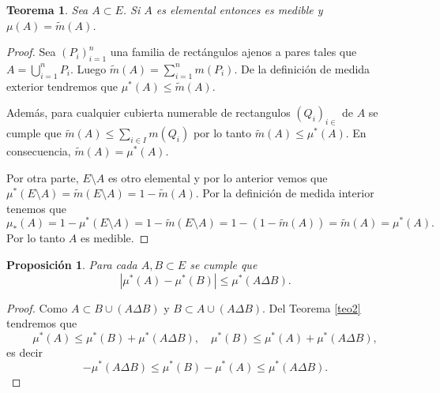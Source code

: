 \documentclass[twoside,12pt,a4 paper,openright]{book}
\newtheorem{teo}[claim]{Teorema}
\newtheorem{pro}[claim]{Proposici\'on}
\begin{document}
\begin{teo}Sea $A\subset E$. Si $A$ es  elemental entonces  es medible 
 y $\mu (A) = \tilde{m}(A)$. 
\end{teo}
\begin{proof}
Sea $(P_i)_{i=1}^n$ una familia de rect\'angulos ajenos a pares tales que $A= \bigcup_{i=1}^n P_i$. Luego $\tilde{m}(A) = \sum_{i=1}^n m(P_i)$. De la definici\'on de medida exterior tendremos que $\mu^*(A)\leq  \tilde{m}(A)$.

Adem\'as, para cualquier   cubierta  numerable de rectangulos $(Q_i)_{i\in }$  de $A $ se cumple que    $\tilde{m}(A) \leq \sum_{i\in I} m(Q_i)$ por lo tanto $\tilde{m}(A   )  \leq    \mu^*(A)$. 
En consecuencia, $\tilde{m}(A   )  =  \mu^*(A)$.  



Por otra parte, $E\setminus A$ es otro elemental y por lo anterior vemos que 
 $ \mu^*(E\setminus A) = \tilde{m}(E\setminus A )  =1-  \tilde{m}(A)$.  Por la definici\'on de medida interior tenemos que  
 $$ \mu_*(  A)= 1 - \mu^* (E\setminus A) = 1- \tilde{m}(E\setminus A ) =1-(1-  \tilde{m}(  A)) = \tilde{m}(A)=   \mu^*(  A). $$
 Por lo tanto $A$ es medible.
 
\end{proof}




\begin{pro}
Para cada $A,B\subset E$ se cumple que 
$$|\mu^*(A)- \mu^*(B)  | \leq \mu^*(A\Delta B).$$
\end{pro}
\begin{proof}
Como $A\subset B\cup (A\Delta B)$ y  $B\subset A\cup (A\Delta B)$. Del Teorema \ref{teo2} tendremos que 
$$\mu^*(A)\leq \mu^* (B)+ \mu^* (A\Delta B), \quad \mu^*(B)\leq \mu^*( A)+ \mu^* (A\Delta B),$$
es decir 
$$- \mu^* (A\Delta B)\leq  \mu^*(B)-  \mu^*( A)\leq  \mu^* (A\Delta B).$$

\end{proof}
\end{document}
